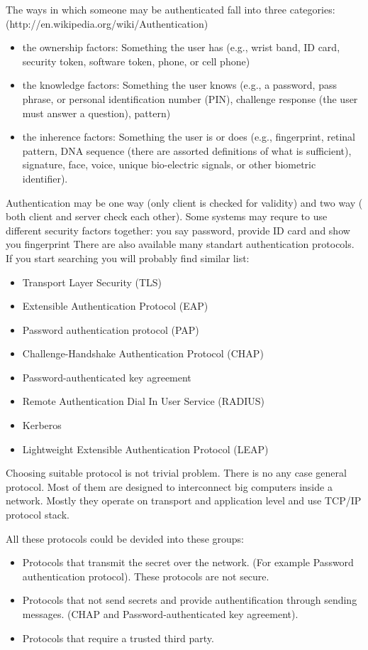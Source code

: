 The ways in which someone may be authenticated fall into three
categories: (http://en.wikipedia.org/wiki/Authentication)
\begin{itemize}
  \item the ownership factors: Something the user has (e.g., wrist band, ID
  card, security token, software token, phone, or cell phone)
  \item the knowledge factors: Something the user knows (e.g., a password, pass
  phrase, or personal identification number (PIN), challenge response (the user must answer a question), pattern)
  \item the inherence factors: Something the user is or does (e.g., fingerprint,
  retinal pattern, DNA sequence (there are assorted definitions of what is sufficient), signature, face, voice, unique bio-electric signals, or other biometric identifier).
\end{itemize}

Authentication may be one way (only client is checked for validity) and two way
( both client and server check each other). Some systems  may requre to use
different security factors together: you say password, provide ID card and show
you fingerprint There are also available many standart authentication protocols.
If you start searching you will probably find similar list:
\begin{itemize}
  \item Transport Layer Security (TLS)
  \item Extensible Authentication Protocol (EAP)
  \item Password authentication protocol (PAP)
  \item Challenge-Handshake Authentication Protocol (CHAP)
  \item Password-authenticated key agreement
  \item Remote Authentication Dial In User Service (RADIUS)
  \item Kerberos
  \item Lightweight Extensible Authentication Protocol (LEAP)  
\end{itemize}

Choosing suitable protocol is not trivial problem. There is no any case general
protocol.  Most of them are designed to interconnect big computers inside a
network. Mostly they operate on transport and application level and use TCP/IP
protocol stack.

All these protocols could be devided into these groups:
\begin{itemize}
  \item Protocols that transmit the secret over the network. (For example
  Password authentication protocol). These protocols are not secure.
  \item Protocols that not send secrets and provide authentification through
  sending messages. (CHAP and Password-authenticated key agreement).
  \item Protocols that require a trusted third party.  
\end{itemize}

